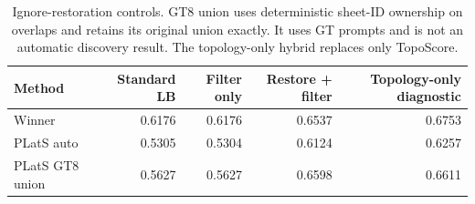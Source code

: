\begin{table}[t]
\centering
\small
\setlength{\tabcolsep}{4pt}
\begin{tabular}{lrrrr}
\toprule
Method & Standard LB & Filter only & Restore + filter & Topology-only diagnostic \\
\midrule
Winner & 0.6176 & 0.6176 & 0.6537 & 0.6753 \\
PLatS auto & 0.5305 & 0.5304 & 0.6124 & 0.6257 \\
PLatS GT8 union & 0.5627 & 0.5627 & 0.6598 & 0.6611 \\
\bottomrule
\end{tabular}
\caption{Ignore-restoration controls. GT8 union uses deterministic sheet-ID ownership on overlaps and retains its original union exactly. It uses GT prompts and is not an automatic discovery result. The topology-only hybrid replaces only TopoScore.}
\label{tab:restorecontrols}
\end{table}
